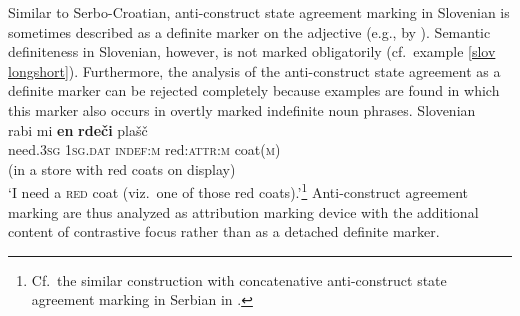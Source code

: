 Similar to Serbo-Croatian, anti\hyp{}construct state agreement marking in Slovenian is sometimes described as a definite marker on the adjective (e.g., by \citealt[411]{priestly1993}). Semantic definiteness in Slovenian, however, is not marked obligatorily (cf.~example \ref{slov longshort}). Furthermore, the analysis of the anti\hyp{}construct state agreement as a definite marker can be rejected completely because examples are found in which this marker also occurs in overtly marked indefinite noun phrases.
\ea
\rm{Slovenian \citep{marusic-etal2007}}\\
\gll 	rabi mi \textbf{en} \textbf{rde\v{c}i} pla\v{s}\v{c}\\
	need.\textsc{3sg} \textsc{1sg.dat} \textsc{indef:m} red:\textsc{attr:m} coat(\textsc{m})\\
\glt (in a store with red coats on display)\\‘I need a \textsc{red} coat (viz.~one of those red coats).’\footnote{Cf.~the similar construction with concatenative anti\hyp{}construct state agreement marking in Serbian in .}
\z
Anti\hyp{}construct agreement marking are thus analyzed as attribution marking device with the additional content of contrastive focus rather than as a detached definite marker.


